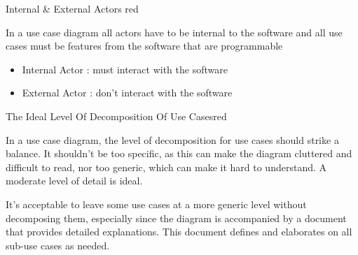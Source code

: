 \begin{center}
\end{center}

\vspace{1cm}
\begin{prettyBox}{Internal \& External Actors }{red}

In a use case diagram all actors have to be internal to the software and all use cases must be
features from the software that are programmable
\begin{itemize}
    \item Internal Actor : must interact with the software 
    \item External Actor : don't interact with the software
\end{itemize}

\end{prettyBox}

\begin{prettyBox}{The Ideal Level Of Decomposition Of Use Cases}{red}

In a use case diagram, the level of decomposition for use cases should strike a balance. It shouldn’t
be too specific, as this can make the diagram cluttered and difficult to read, nor too generic, which
can make it hard to understand. A moderate level of detail is ideal.

\vspace{0.15cm}
It's acceptable to leave some use cases at a more generic level without decomposing them, especially
since the diagram is accompanied by a document that provides detailed explanations. 
This document defines and elaborates on all sub-use cases as needed.

\end{prettyBox}


